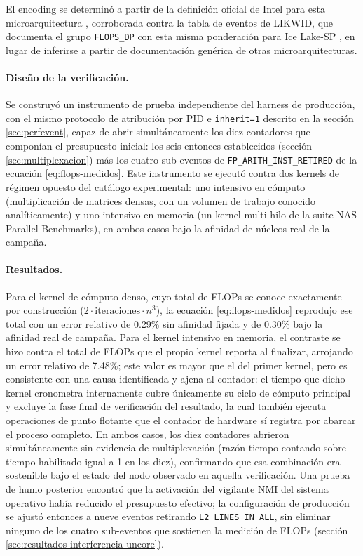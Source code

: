\documentclass[12pt,oneside,spanish]{book}
\begin{document}
El encoding se determinó a partir de la definición oficial de Intel para esta microarquitectura \cite{IntelPerfmon2026}, corroborada contra la tabla de eventos de LIKWID, que documenta el grupo \texttt{FLOPS\_DP} con esta misma ponderación para Ice Lake-SP \cite{Treibig2010}, en lugar de inferirse a partir de documentación genérica de otras microarquitecturas.

\paragraph{Diseño de la verificación.} Se construyó un instrumento de prueba independiente del harness de producción, con el mismo protocolo de atribución por PID e \texttt{inherit=1} descrito en la sección \ref{sec:perfevent}, capaz de abrir simultáneamente los diez contadores que componían el presupuesto inicial: los seis entonces establecidos (sección \ref{sec:multiplexacion}) más los cuatro sub-eventos de \texttt{FP\_ARITH\_INST\_RETIRED} de la ecuación \eqref{eq:flops-medidos}. Este instrumento se ejecutó contra dos kernels de régimen opuesto del catálogo experimental: uno intensivo en cómputo (multiplicación de matrices densas, con un volumen de trabajo conocido analíticamente) y uno intensivo en memoria (un kernel multi-hilo de la suite NAS Parallel Benchmarks), en ambos casos bajo la afinidad de núcleos real de la campaña.

\paragraph{Resultados.} Para el kernel de cómputo denso, cuyo total de FLOPs se conoce exactamente por construcción ($2 \cdot \text{iteraciones} \cdot n^{3}$), la ecuación \eqref{eq:flops-medidos} reprodujo ese total con un error relativo de 0.29\% sin afinidad fijada y de 0.30\% bajo la afinidad real de campaña. Para el kernel intensivo en memoria, el contraste se hizo contra el total de FLOPs que el propio kernel reporta al finalizar, arrojando un error relativo de 7.48\%; este valor es mayor que el del primer kernel, pero es consistente con una causa identificada y ajena al contador: el tiempo que dicho kernel cronometra internamente cubre únicamente su ciclo de cómputo principal y excluye la fase final de verificación del resultado, la cual también ejecuta operaciones de punto flotante que el contador de hardware sí registra por abarcar el proceso completo. En ambos casos, los diez contadores abrieron simultáneamente sin evidencia de multiplexación (razón tiempo-contando sobre tiempo-habilitado igual a 1 en los diez), confirmando que esa combinación era sostenible bajo el estado del nodo observado en aquella verificación. Una prueba de humo posterior encontró que la activación del vigilante NMI del sistema operativo había reducido el presupuesto efectivo; la configuración de producción se ajustó entonces a nueve eventos retirando \texttt{L2\_LINES\_IN\_ALL}, sin eliminar ninguno de los cuatro sub-eventos que sostienen la medición de FLOPs (sección \ref{sec:resultados-interferencia-uncore}).
\end{document}
